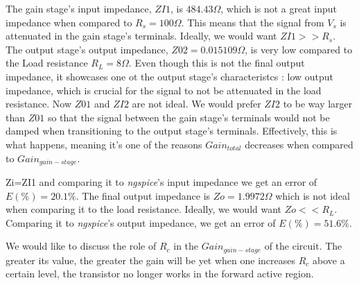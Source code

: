 The gain stage's input impedance, $ZI1$, is $484.43\Omega$, which is not a great input impedance when compared to $R_s=100\Omega$. This means that the signal from $V_s$ is
attenuated in the gain stage's terminals. Ideally, we would want $ZI1>>R_s$. The output stage's output impedance, $Z02=0.015109 \Omega$, is very low compared to the Load resistance $R_L=8\Omega$.
Even though this is not the final output impedance, it showcases one ot the output stage's characteristcs : low output impedance, which is crucial for the signal to not be attenuated in the load resistance.
Now $Z01$ and $ZI2$ are not ideal. We would prefer $ZI2$ to be way larger than $Z01$ so that the signal between the gain stage's terminals would not be damped when transitioning to the output stage's terminals.
Effectively, this is what happens, meaning it's one of the reasons $Gain_{total}$ decreases when compared to $Gain_{gain-stage}$.\par
Zi=ZI1 and comparing it to \textit{ngspice}'s input impedance we get an error of $E(\%)=20.1\%$. The final output impedance is $Zo=1.9972\Omega$ which is not ideal when comparing it to the load resistance. Ideally,
we would want $Zo<<R_L$. Comparing it to \textit{ngspice}'s output impedance, we get an error of $E(\%)=51.6\%$.
\par
We would like to discuss the role of $R_c$ in the $Gain_{gain-stage}$ of the circuit. The greater its value, the greater the gain will be yet when one increases $R_c$ above a certain level, the transistor no longer works in
the forward active region.
